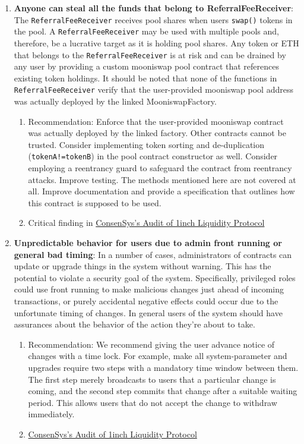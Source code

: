 \begin{enumerate}
\item\textbf{Anyone can steal all the funds that belong to ReferralFeeReceiver}: The \verb|ReferralFeeReceiver| receives pool shares when users \verb|swap()| tokens in the pool. A \verb|ReferralFeeReceiver| may be used with multiple pools and, therefore, be a lucrative target as it is holding pool shares. Any token or ETH that belongs to the \verb|ReferralFeeReceiver| is at risk and can be drained by any user by providing a custom mooniswap pool contract that references existing token holdings. It should be noted that none of the functions in \verb|ReferralFeeReceiver| verify that the user-provided mooniswap pool address was actually deployed by the linked MooniswapFactory.
	\begin{enumerate}
	\item Recommendation: Enforce that the user-provided mooniswap contract was actually deployed by the linked factory. Other contracts cannot be trusted. Consider implementing token sorting and de-duplication (\verb|tokenA!=tokenB|) in the pool contract constructor as well. Consider employing a reentrancy guard to safeguard the contract from reentrancy attacks. Improve testing. The methods mentioned here are not covered at all. Improve documentation and provide a specification that outlines how this contract is supposed to be used.
	\item Critical finding in \href{https://consensys.net/diligence/audits/2020/12/1inch-liquidity-protocol/\#out-of-scope-referralfeereceiver-anyone-can-steal-all-the-funds-that-belong-to-referralfeereceiver}{ConsenSys's Audit of 1inch Liquidity Protocol}
	\end{enumerate}

\item\textbf{Unpredictable behavior for users due to admin front running or general bad timing}: In a number of cases, administrators of contracts can update or upgrade things in the system without warning. This has the potential to violate a security goal of the system. Specifically, privileged roles could use front running to make malicious changes just ahead of incoming transactions, or purely accidental negative effects could occur due to the unfortunate timing of changes. In general users of the system should have assurances about the behavior of the action they’re about to take.
	\begin{enumerate}
	\item Recommendation: We recommend giving the user advance notice of changes with a time lock. For example, make all system-parameter and upgrades require two steps with a mandatory time window between them. The first step merely broadcasts to users that a particular change is coming, and the second step commits that change after a suitable waiting period. This allows users that do not accept the change to withdraw immediately.
	\item\href{https://consensys.net/diligence/audits/2020/12/1inch-liquidity-protocol/\#unpredictable-behavior-for-users-due-to-admin-front-running-or-general-bad-timing}{ConsenSys's Audit of 1inch Liquidity Protocol}
	\end{enumerate}


\end{enumerate}
